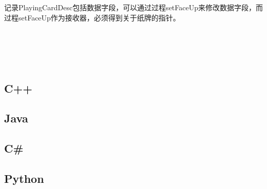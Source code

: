 记录PlayingCardDesc包括数据字段，可以通过过程setFaceUp来修改数据字段，而过程setFaceUp作为接收器，必须得到关于纸牌的指针。


\begin{lstlisting}[language=Oberon-2]

\end{lstlisting}




\begin{lstlisting}[language=Oberon-2]

\end{lstlisting}




\begin{lstlisting}[language=Oberon-2]

\end{lstlisting}




\begin{lstlisting}[language=Oberon-2]

\end{lstlisting}




\begin{lstlisting}[language=Oberon-2]

\end{lstlisting}




\begin{lstlisting}[language=Oberon-2]

\end{lstlisting}

\subsection{C++}




\subsection{Java}



\subsection{C\#}


\subsection{Python}


